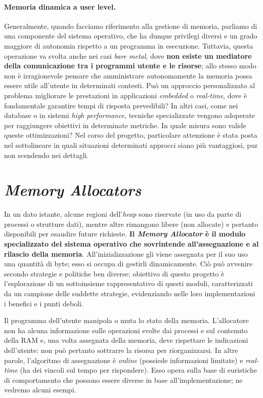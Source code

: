 \paragraph{Memoria dinamica a user level.} 
Generalmente, quando facciamo riferimento alla gestione di memoria, parliamo di una componente del sistema operativo, che ha dunque privilegi diversi e un grado maggiore di autonomia rispetto a un programma in esecuzione. Tuttavia, questa operazione va svolta anche nei casi \textit{bare metal}, dove \textbf{non esiste un mediatore della comunicazione tra i programmi utente e le risorse}; allo stesso modo non è irragionevole pensare che amministrare autonomamente la memoria possa essere utile all'utente in determinati contesti. Può un approccio personalizzato al problema migliorare le prestazioni in applicazioni \textit{embedded} o \textit{real-time}, dove è fondamentale garantire tempi di risposta prevedibili?  In altri casi, come nei database o in sistemi \textit{high performance}, tecniche specializzate vengono adoperate per raggiungere obiettivi in determinate metriche. In quale misura sono valide queste ottimizzazioni? Nel corso del progetto, particolare attenzione è stata posta nel sottolineare in quali situazioni determinati approcci siano più vantaggiosi, pur non scendendo nei dettagli.

\section{\textit{Memory Allocators}}

In un dato istante, alcune regioni dell'\textit{heap} sono riservate (in uso da parte di processi o strutture dati), mentre altre rimangono libere (non allocate) e pertanto disponibili per esaudire future richieste. \textbf{Il \textit{Memory Allocator} è il modulo specializzato del sistema operativo che sovrintende all'assegnazione e al rilascio della memoria}. All'inizializzazione gli viene assegnata per il suo uso una quantità di byte; esso si occupa di gestirli dinamicamente. Ciò può avvenire secondo strategie e politiche ben diverse: obiettivo di questo progetto è l'esplorazione di un sottoinsieme rappresentativo di questi moduli, caratterizzati da un campione delle suddette strategie, evidenziando nelle loro implementazioni i benefici e i punti deboli.

Il programma dell'utente manipola o muta lo stato della memoria. L'allocatore non ha alcuna informazione sulle operazioni svolte dai processi e sul contenuto della RAM e, una volta assegnata della memoria, deve rispettare le indicazioni dell'utente: non può pertanto sottrarre la risorsa per riorganizzarsi. In altre parole, l'algoritmo di assegnazione è \textit{online} (possiede informazioni limitate) e \textit{real-time} (ha dei vincoli sul tempo per rispondere). Esso opera sulla base di euristiche di comportamento che possono essere diverse in base all'implementazione; ne vedremo alcuni esempi.

